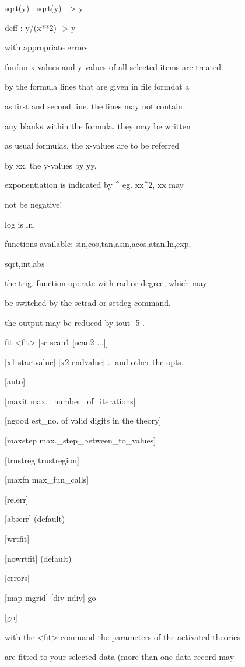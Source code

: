 \documentclass[]{article}
\begin{document}
sqrt(y) : sqrt(y)-\/-\/-\textgreater{} y

deff : y/(x**2) -\textgreater{} y

with appropriate errors

funfun x-values and y-values of all selected items are treated

by the formula lines that are given in file formdat a

as first and second line. the lines may not contain

any blanks within the formula. they may be written

as usual formulas, the x-values are to be referred

by xx, the y-values by yy.

exponentiation is indicated by \^{} eg. xx\^{}2, xx may

not be negative!

log is ln.

functions available: sin,cos,tan,asin,acos,atan,ln,exp,

sqrt,int,abs

the trig. function operate with rad or degree, which may

be switched by the setrad or setdeg command.

the output may be reduced by iout -5 .

fit \textless{}fit\textgreater{} {[}sc scan1 {[}scan2 ...{]}{]}

{[}x1 startvalue{]} {[}x2 endvalue{]} .. and other thc opts.

{[}auto{]}

{[}maxit max.\_number\_of\_iterations{]}

{[}ngood est\_no. of valid digits in the theory{]}

{[}maxstep max.\_step\_between\_to\_values{]}

{[}trustreg trustregion{]}

{[}maxfn max\_fun\_calls{]}

{[}relerr{]}

{[}abserr{]} (default)

{[}wrtfit{]}

{[}nowrtfit{]} (default)

{[}errors{]}

{[}map mgrid{]} {[}div ndiv{]} go

{[}go{]}

with the \textless{}fit\textgreater{}-command the parameters of the
activated theories

are fitted to your selected data (more than one data-record may
\end{document}
